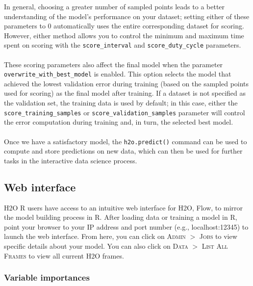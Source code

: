 In general, choosing a greater number of sampled points leads to a better understanding of the model's performance on your dataset; setting either of these parameters to 0 automatically uses the entire corresponding dataset for scoring. However, either method allows you to control the minimum and maximum time spent on scoring with the \texttt{score\_interval} and \texttt{score\_duty\_cycle} parameters.
\\
\\
These scoring parameters also affect the final model when the parameter \texttt{overwrite\_with\_best\_model} is enabled. This option selects the model that achieved the lowest validation error during training (based on the sampled points used for scoring) as the final model after training. If a dataset is not specified as the validation set, the training data is used by default; in this case, either the \texttt{score\_training\_samples} or \texttt{score\_validation\_samples} parameter will control the error computation during training and, in turn, the selected best model.
\\
\\
Once we have a satisfactory model, the \texttt{h2o.predict()} command can be used to compute and store predictions on new data, which can then be used for further tasks in the interactive data science process.

\waterExampleInR


\waterExampleInPython




\subsection{Web interface} 

H2O R users have access to an intuitive web interface for H2O, Flow, to mirror the model building process in R. After loading data or training a model in R, point your browser to your IP address and port number (e.g., localhost:12345) to launch the web interface. From here, you can click on \textsc{Admin} $>$ \textsc{Jobs} to view specific details about your model. You can also click on \textsc{Data} $>$ \textsc{List All Frames} to view all current H2O frames. 

\subsubsection{Variable importances} 

